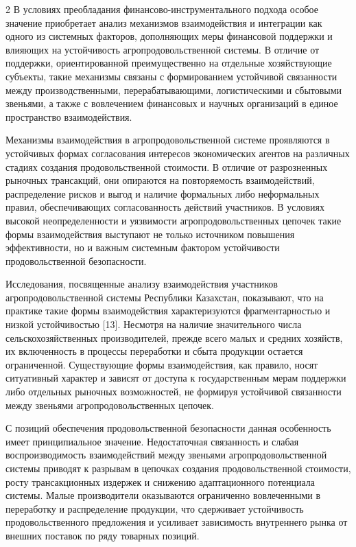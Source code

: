 \begin{multicols}{2}
В условиях преобладания финансово-инструментального подхода особое
значение приобретает анализ механизмов взаимодействия и интеграции как
одного из системных факторов, дополняющих меры финансовой поддержки и
влияющих на устойчивость агропродовольственной системы. В отличие от
поддержки, ориентированной преимущественно на отдельные хозяйствующие
субъекты, такие механизмы связаны с формированием устойчивой связанности
между производственными, перерабатывающими, логистическими и сбытовыми
звеньями, а также с вовлечением финансовых и научных организаций в
единое пространство взаимодействия.

Механизмы взаимодействия в агропродовольственной системе проявляются в
устойчивых формах согласования интересов экономических агентов на
различных стадиях создания продовольственной стоимости. В отличие от
разрозненных рыночных трансакций, они опираются на повторяемость
взаимодействий, распределение рисков и выгод и наличие формальных либо
неформальных правил, обеспечивающих согласованность действий участников.
В условиях высокой неопределенности и уязвимости агропродовольственных
цепочек такие формы взаимодействия выступают не только источником
повышения эффективности, но и важным системным фактором устойчивости
продовольственной безопасности.

Исследования, посвященные анализу взаимодействия участников
агропродовольственной системы Республики Казахстан, показывают, что на
практике такие формы взаимодействия характеризуются фрагментарностью и
низкой устойчивостью {[}13{]}. Несмотря на наличие значительного числа
сельскохозяйственных производителей, прежде всего малых и средних
хозяйств, их включенность в процессы переработки и сбыта продукции
остается ограниченной. Существующие формы взаимодействия, как правило,
носят ситуативный характер и зависят от доступа к государственным мерам
поддержки либо отдельных рыночных возможностей, не формируя устойчивой
связанности между звеньями агропродовольственных цепочек.

С позиций обеспечения продовольственной безопасности данная особенность
имеет принципиальное значение. Недостаточная связанность и слабая
воспроизводимость взаимодействий между звеньями агропродовольственной
системы приводят к разрывам в цепочках создания продовольственной
стоимости, росту трансакционных издержек и снижению адаптационного
потенциала системы. Малые производители оказываются ограниченно
вовлеченными в переработку и распределение продукции, что сдерживает
устойчивость продовольственного предложения и усиливает зависимость
внутреннего рынка от внешних поставок по ряду товарных позиций.


\end{multicols}
